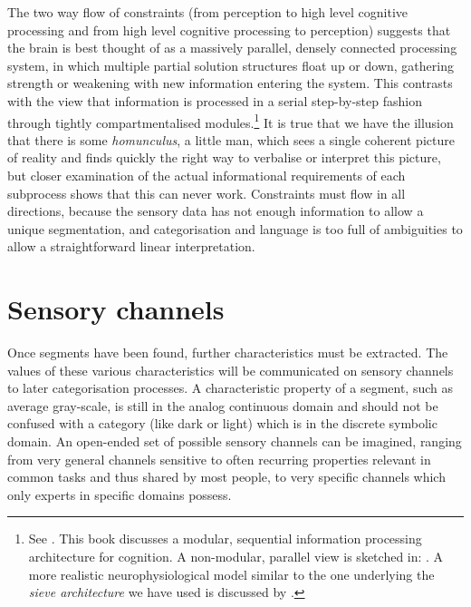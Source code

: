 The two way flow of constraints (from perception to 
high level cognitive processing and from high level 
cognitive processing to perception) suggests 
that the brain is best thought of as a massively parallel, 
densely connected processing system, in which multiple 
partial solution structures float up or down, gathering strength 
or weakening with new information entering the system. 
This contrasts with the view that \enlargethispage{1\baselineskip}
information is processed in a serial step-by-step fashion
through tightly compartmentalised modules.\footnote{
See \cite{Fodor:1983}. This book discusses a modular, sequential 
information processing architecture for cognition. A 
non-modular, parallel view 
is sketched in: \cite{Minsky:1985}. 
A more realistic neurophysiological model similar to the 
one underlying the {\itshape sieve architecture} we have used is
discussed by \cite{Edelman:1987}.} It is true
that we have the illusion that there 
is some {\itshape homunculus}, a little man, which sees a single coherent 
picture of reality and finds quickly the right way to 
verbalise or interpret this picture, but closer examination 
of the actual informational requirements of each subprocess
shows that this can never work. Constraints must flow in all 
directions, because the sensory data has not enough information to allow 
a unique segmentation, and categorisation and language is 
too full of ambiguities to allow a straightforward linear
interpretation. 

\section{Sensory channels}

Once segments have been found, further characteristics must
be extracted. The values of these various characteristics
will be communicated on sensory channels to later categorisation
processes. A characteristic property of a segment, such as 
average gray-scale, is still in the
analog continuous domain and should not be confused with
a category (like dark or light) which is in the
discrete symbolic domain. An open-ended set of possible sensory 
channels can be imagined, ranging from very general 
channels sensitive to often recurring properties relevant
in common tasks and thus shared by most people, to very 
specific channels which only experts in specific
domains possess. 

